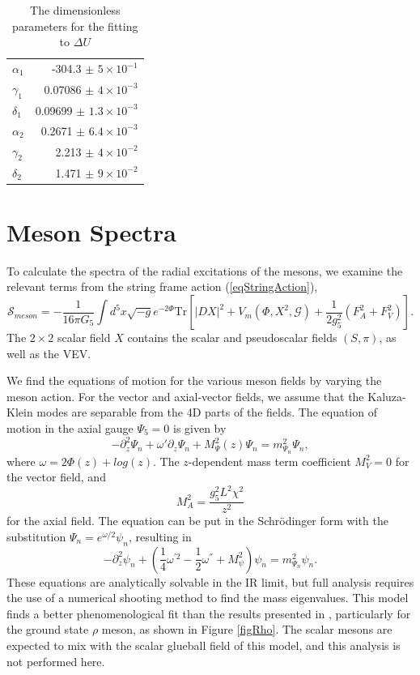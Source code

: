 \documentclass[aps,prd,12pt,nofootinbib]{revtex4}
\newcommand{\be}{\begin{equation}}
\newcommand{\ee}{\end{equation}}
\def\thalf{{\textstyle{\frac{1}{2}}}}
\def\oneqt{{\textstyle{\frac{1}{4}}}}
\newcommand{\cS}{\mathcal S}
\begin{document}
\begin{table}[htb]
\begin{center}
\label{tabFit}
\begin{tabular}{| l | r | }
\hline
$\alpha_1$ & -304.3 $\pm$ $5 \times 10^{-1} $\\
$\gamma_1$ & 0.07086 $\pm$ $ 4 \times 10^{-3}$ \\ 
$\delta_1$ & 0.09699 $\pm $ $1.3 \times 10^{-3}$\\ 
$\alpha_2$ & 0.2671 $\pm $ $6.4 \times 10^{-3}$  \\
$\gamma_2$& 	2.213 $\pm $ $4 \times 10^{-2}$ \\
$\delta_2$ & 1.471 $\pm $ $9 \times 10^{-2} $\\
  \hline
\end{tabular}
\caption{The dimensionless parameters for the fitting to $\Delta U$}
\end{center}
\end{table}

\section{Meson Spectra}

To calculate the spectra of the radial excitations of the mesons, we examine the relevant terms from the string frame action (\ref{eqStringAction}),
\be
\cS_{meson}=-\frac{1}{16\pi G_5} \int d^5x \sqrt{-g} e^{-2\Phi}\mathrm{Tr}\left[ \left|DX\right|^2+V_m(\Phi,X^2,\mathcal{G})+\frac{1}{2g_5^2}\left(F_A^2 +F_V^2\right) \right].
\label{eqMesonL}
\ee
The $2 \times 2$ scalar  field $X$ contains the scalar and pseudoscalar fields $(S,\pi)$, as well as the VEV.

We find the equations of motion for the various meson fields by varying the meson action.
For the vector and axial-vector fields, we  assume that the Kaluza-Klein modes are separable from the 4D parts of the fields.
The equation of motion in the axial gauge $\Psi_5=0$  is given by
\be
-\partial_z^2\Psi_n+\omega'\partial_z\Psi_n +M_\Psi^2(z) \Psi_n=m^2_{\Psi_n}\Psi_n,
\ee
where $\omega=2\Phi(z)+log(z)$. 
The $z$-dependent mass term coefficient $M^2_V=0$  for the vector field, and 
\be
M^2_A=\frac{g_5^2L^2\chi^2}{z^2}
\ee
for the axial field.
The equation can be put in the Schr{\"o}dinger form with the substitution $\Psi_n=e^{\omega/2}\psi_n$, resulting in
\be
-\partial^2_z\psi_n+\left(\oneqt \omega^{'2}-\thalf\omega^{''}+M_\psi^2\right)\psi_n=m^2_{\Psi_n}\psi_n.
\ee
These equations are analytically solvable in the IR limit, but full analysis requires the use of a numerical shooting method to find the mass eigenvalues.
This model finds a better phenomenological fit than the results presented in \cite{gherghetta-kelley}, particularly for the ground state $\rho$ meson, as shown in Figure \ref{figRho}. 
The scalar mesons are expected to mix with the scalar glueball field of this model, and this analysis is not performed here. 
\end{document}
